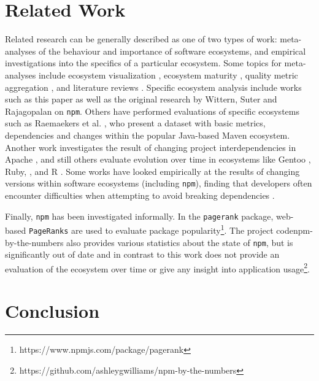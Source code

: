 \documentclass[10pt,conference]{IEEEtran}
\def\code#1{\texttt{#1}}
\begin{document}

\section{Related Work}

Related research can be generally described as one of two types
of work: meta-analyses of the behaviour and importance
of software ecosystems, and empirical investigations into the
specifics of a particular ecosystem. Some topics 
for meta-analyses include ecosystem visualization \cite{LUNGU2010264},
ecosystem maturity \cite{Alves:2011}, quality metric aggregation \cite{Mordal:2013},
and literature reviews \cite{Manikas:2013, Manikas:2017}. Specific ecosystem analysis include works such as this
paper as well as the original research by Wittern, Suter and Rajagopalan \cite{Wittern:2016} on \code{npm}.
Others have performed evaluations of specific ecosystems such as Raemaekers et al. \cite{Raemaekers:2013},
who present a dataset with basic metrics, dependencies and changes within the popular 
Java-based Maven ecosystem. Another work investigates the
result of changing project interdependencies in Apache \cite{Bavota:2013}, 
and still others evaluate evolution over time in ecosystems like
Gentoo \cite{Bloemen:2014}, Ruby, \cite{Kabbedijk:2011}, and R \cite{Plakidas:2017}.
Some works have looked empirically at the results of changing versions
within software ecosystems (including \code{npm}), finding that
developers often encounter difficulties when attempting to avoid
breaking dependencies \cite{Bogart:2015}.

Finally, \code{npm} has been investigated informally. In
the \code{pagerank} package, web-based \code{PageRanks} are used to evaluate
package popularity\footnote{https://www.npmjs.com/package/pagerank}.
The project code{npm-by-the-numbers} also provides various statistics
about the state of \code{npm}, but is significantly out of date and 
in contrast to this work does not provide an evaluation of the ecosystem over time
or give any insight into application usage\footnote{https://github.com/ashleygwilliams/npm-by-the-numbers}.


\section{Conclusion}
\end{document}
